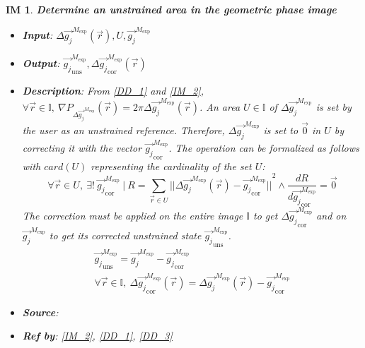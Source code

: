 \documentclass[12pt]{article}
\newtheorem{IM}{IM}
\begin{document}
\begin{IM}
\label{IM_3}
\noindent\colorbox{shadecolorIM}{\normalfont \textbf{Determine an unstrained area in the geometric phase image}}
\normalfont
\begin{itemize}
\item \textbf{Input}: $\Delta \overrightarrow{g_{j}}^{M_{\text{exp}}}(\vec{r}),U,\overrightarrow{g_{j}}^{M_{\text{exp}}}$
\item \textbf{Output}: $\overrightarrow{g_{j}}_{\text{uns}}^{M_{\text{exp}}}, \Delta\overrightarrow{g_{j}}_{\text{cor}}^{M_{\text{exp}}}(\vec{r})$
\item \textbf{Description}: From \cref{DD_1} and \cref{IM_2}, $\forall \vec{r} \in \mathbb{I},\  \nabla P_{\Delta \overrightarrow{g_{j}}^{M_{\text{exp}}}} (\vec{r}) = 2\pi \Delta \overrightarrow{g_{j}}^{M_{\text{exp}}}(\vec{r})$. An area $U \in \mathbb{I}$ of $\Delta \overrightarrow{g_{j}}^{M_{\text{exp}}}$ is set by the user as an unstrained reference. Therefore, $\Delta \overrightarrow{g_{j}}^{M_{\text{exp}}}$ is set to $\overrightarrow{0}$ in $U$ by correcting it with the vector $\overrightarrow{g_{j}}_{\text{cor}}^{M_{\text{exp}}}$. The operation can be formalized as follows with $card(U)$ representing the cardinality of the set $U$:
\begin{equation}
\forall \vec{r} \in U, \ \exists! \ \overrightarrow{g_{j}}_{\text{cor}}^{M_{\text{exp}}} \ | \ R=\sum_{\vec{r}\in U}{||\Delta \overrightarrow{g_{j}}^{M_{\text{exp}}}(\vec{r})-\overrightarrow{g_{j}}_{\text{cor}}^{M_{\text{exp}}}||}^{2} \wedge \frac{dR}{d\overrightarrow{g_{j}}_{\text{cor}}^{M_{\text{exp}}}}=\overrightarrow{0}
\end{equation}
The correction must be applied on the entire image $\mathbb{I}$ to get $\Delta\overrightarrow{g_{j}}_{\text{cor}}^{M_{\text{exp}}}$ and on $\overrightarrow{g_{j}}^{M_{\text{exp}}}$ to get its corrected unstrained state $\overrightarrow{g_{j}}_{\text{uns}}^{M_{\text{exp}}}$.
\begin{equation}
\begin{gathered}
\overrightarrow{g_{j}}_{\text{uns}}^{M_{\text{exp}}} = \overrightarrow{g_{j}}^{M_{\text{exp}}} -\overrightarrow{g_{j}}_{\text{cor}}^{M_{\text{exp}}} \\
\forall \vec{r} \in \mathbb{I}, \ \Delta\overrightarrow{g_{j}}_{\text{cor}}^{M_{\text{exp}}}(\vec{r})=\Delta \overrightarrow{g_{j}}^{M_{\text{exp}}}(\vec{r})-\overrightarrow{g_{j}}_{\text{cor}}^{M_{\text{exp}}}
\end{gathered}
\end{equation}
\item \textbf{Source}: \cite{Hytch1998}
\item \textbf{Ref by}: \cref{IM_2}, \cref{DD_1}, \cref{DD_3}
\end{itemize}
\end{IM}
\end{document}
